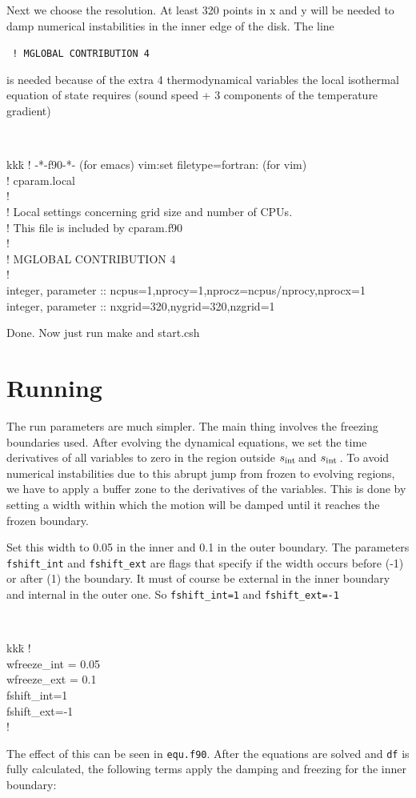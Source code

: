 \documentclass[a4paper,10pt]{article}
\newcommand{\rint}{$s_{\rm int}\,$}
\begin{document}
Next we choose the resolution. At least 320 points in x and y will be needed to damp numerical instabilities in the inner edge of the disk. The line 

{\tt 
! MGLOBAL CONTRIBUTION 4 
} 

is needed because of the extra 4 thermodynamical variables the local isothermal equation of state requires (sound speed + 3 components of the temperature gradient) 


{\tt 
\begin{tabbing}
  kkk\=\kill
!  -*-f90-*-  (for emacs)    vim:set filetype=fortran:  (for vim)\\
!  cparam.local\\
!\\
!  Local settings concerning grid size and number of CPUs.\\
!  This file is included by cparam.f90\\
!\\
! MGLOBAL CONTRIBUTION 4\\
!\\
\>integer, parameter :: ncpus=1,nprocy=1,nprocz=ncpus/nprocy,nprocx=1\\
\>integer, parameter :: nxgrid=320,nygrid=320,nzgrid=1
\end{tabbing}
}Done. Now just run make and start.csh


\section{Running}

The run parameters are much simpler. The main thing involves the freezing boundaries used. After evolving the dynamical equations, we set the time derivatives of all
variables to zero in the region outside \rint and \rint. To avoid numerical instabilities due to this abrupt jump from frozen to evolving regions, we have to apply a buffer zone to the derivatives of the variables. This is done by setting a width within which the motion will be damped until it reaches the frozen boundary. 

Set this width to 0.05 in the inner and 0.1 in the outer boundary. The parameters {\tt fshift\_int} and {\tt fshift\_ext} are flags that specify if the width occurs before (-1) or after (1) the boundary. It must of course be external in the inner boundary and internal in the outer one. So {\tt fshift\_int=1} and {\tt fshift\_ext=-1}

{\tt 
\begin{tabbing}
  kkk\=\kill
!\\
  \>wfreeze\_int = 0.05\\
  \>wfreeze\_ext = 0.1\\
  \>fshift\_int=1\\
  \>fshift\_ext=-1\\
!
\end{tabbing}
}The effect of this can be seen in {\tt equ.f90}. After the equations are solved and {\tt df} is fully calculated, the following terms apply the damping and freezing for the inner boundary:
\end{document}
